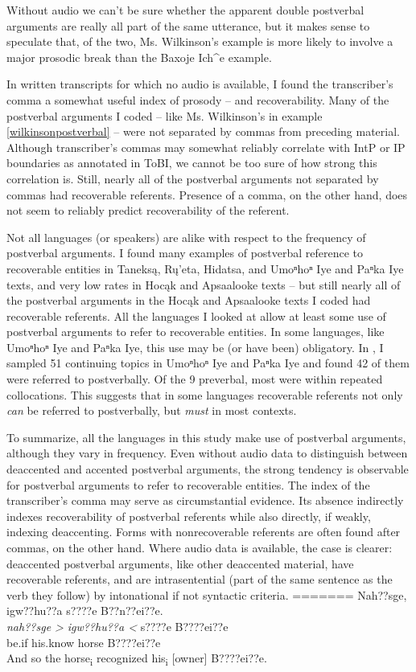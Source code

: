 \documentclass[output=paper]{LSP/langsci}
\begin{document}
Without audio we can’t be sure whether the apparent double postverbal arguments are really all part of the same utterance, but it makes sense to speculate that, of the two, Ms. Wilkinson’s example is more likely to involve a major prosodic break than the Baxoje Ich\^{}e example.

In written transcripts for which no audio is available, I found the transcriber’s comma a somewhat useful index of prosody -- and recoverability. Many of the postverbal arguments I coded -- like Ms. Wilkinson’s in example \ref{wilkinsonpostverbal} -- were not separated by commas from preceding material. Although transcriber’s commas may somewhat reliably correlate with IntP or IP boundaries as annotated in ToBI, we cannot be too sure of how strong this correlation is. Still, nearly all of the postverbal arguments not separated by commas had recoverable referents. Presence of a comma, on the other hand, does not seem to reliably predict recoverability of the referent.

Not all languages (or speakers) are alike with respect to the frequency of postverbal arguments. I found many examples of postverbal reference to recoverable entities in Taneksą, Rų’eta, Hidatsa, and Umoⁿhoⁿ Iye and Paⁿka Iye texts, and very low rates in Hocąk and Apsaalooke texts -- but still nearly all of the postverbal arguments in the Hocąk and Apsaalooke texts I coded had recoverable referents. All the languages I looked at allow at least some use of postverbal arguments to refer to recoverable entities. In some languages, like Umoⁿhoⁿ Iye and Paⁿka Iye, this use may be (or have been) obligatory. In \citet{Gordon2008}, I sampled 51 continuing topics in Umoⁿhoⁿ Iye and Paⁿka Iye and found 42 of them were referred to postverbally. Of the 9 preverbal, most were within repeated collocations. This suggests that in some languages recoverable referents not only \emph{can} be referred to postverbally, but \emph{must} in most contexts.

To summarize, all the languages in this study make use of postverbal arguments, although they vary in frequency. Even without audio data to distinguish between deaccented and accented postverbal arguments, the strong tendency is observable for postverbal arguments to refer to recoverable entities. The index of the transcriber’s comma may serve as circumstantial evidence. Its absence indirectly indexes recoverability of postverbal referents while also directly, if weakly, indexing deaccenting. Forms with nonrecoverable referents are often found after commas, on the other hand. Where audio data is available, the case is clearer: deaccented postverbal arguments, like other deaccented material, have recoverable referents, and are intrasentential (part of the same sentence as the verb they follow) by intonational if not syntactic criteria.
=======
Nah??sge, igw??hu??a s????e B??n??ei??e.\footnotemark\\
\gll	\emph{nah??sge >}	\emph{igw??hu??a <}	s????e 		B????ei??e\\
	be.if 			his.know 			horse 		B????ei??e\\
\glt	And so the horse\textsubscript{i} recognized his\textsubscript{i} [owner] B????ei??e.
\z\z
\end{document}
